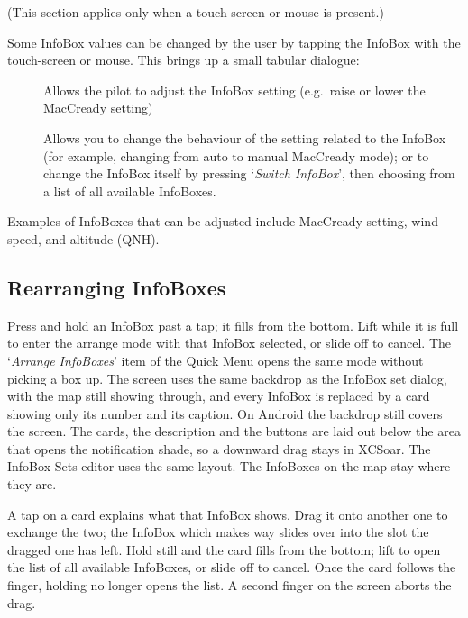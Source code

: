 (This section applies only when a touch-screen or mouse is present.)

Some InfoBox values can be changed by the user by tapping the
InfoBox with the touch-screen or mouse.  This brings up a small tabular dialogue:

\begin{description}
\item[]  
  Allows the pilot to adjust the InfoBox setting (e.g.\ raise or lower the
  MacCready setting)

\item[]
  Allows you to change the behaviour of the setting related to the InfoBox 
  (for example, changing from auto to manual MacCready mode); or 
  to change the InfoBox itself by pressing `\emph{Switch InfoBox}', then 
  choosing from a list of all available InfoBoxes.

\end{description}

Examples of InfoBoxes that can
be adjusted include MacCready setting, wind speed, and altitude (QNH).


\subsection*{Rearranging InfoBoxes}\label{sec:arrange_infoboxes}

Press and hold an InfoBox past a tap; it fills from the bottom.
Lift while it is full to enter the arrange mode with that InfoBox
selected, or slide off to cancel.  The `\emph{Arrange InfoBoxes}'
item of the Quick Menu opens the same mode without picking a box up.
The screen uses the same backdrop as the InfoBox set dialog, with the
map still showing through, and every InfoBox is replaced by a card
showing only its number and its caption.
On Android the backdrop still covers the screen.  The cards, the
description and the buttons are laid out below the area that opens
the notification shade, so a downward drag stays in XCSoar.  The
InfoBox Sets editor uses the same layout.  The InfoBoxes on the map
stay where they are.

A tap on a card explains what that InfoBox shows.  Drag it onto
another one to exchange the two; the InfoBox which makes way slides
over into the slot the dragged one has left.  Hold still and the card fills from the bottom; lift to open the
list of all available InfoBoxes, or slide off to cancel.  Once the
card follows the finger, holding no longer opens the list.  A second
finger on the screen aborts the drag.

